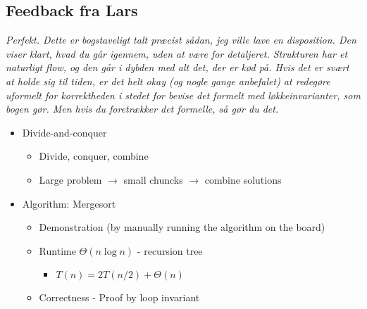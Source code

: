 \subsection*{Feedback fra Lars}
\textit{Perfekt. Dette er bogstaveligt talt præcist sådan, jeg ville lave en disposition. Den viser klart, hvad du går igennem, uden at være for detaljeret. Strukturen har et naturligt flow, og den går i dybden med alt det, der er kød på. Hvis det er svært at holde sig til tiden, er det helt okay (og nogle gange anbefalet) at redegøre uformelt for korrektheden i stedet for bevise det formelt med løkkeinvarianter, som bogen gør. Men hvis du foretrækker det formelle, så gør du det.
}


\begin{itemize}
    \item Divide-and-conquer
    \begin{itemize}
        \item Divide, conquer, combine
        \item Large problem $\to$ small chuncks $\to$ combine solutions
    \end{itemize}
    \item Algorithm: Mergesort
    \begin{itemize}
        \item Demonstration (by manually running the algorithm on the board)
        \item Runtime $\Theta(n\log n)$ - recursion tree
        \begin{itemize}
            \item $T(n)=2T(n/2)+ \Theta(n)$
        \end{itemize}
        \item Correctness - Proof by loop invariant
    \end{itemize}
\end{itemize}
